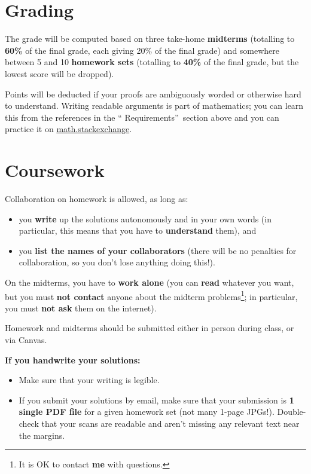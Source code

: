 \documentclass[numbers=enddot,12pt,final,onecolumn,notitlepage]{scrartcl}%
\theoremstyle{definition}
\begin{document}
\bigskip

\section{Grading}

The grade will be computed based on three take-home \textbf{midterms}
(totalling to \textbf{60\%} of the final grade, each giving 20\% of the final
grade) and somewhere between 5 and 10 \textbf{homework sets} (totalling to
\textbf{40\%} of the final grade, but the lowest score will be dropped).

Points will be deducted if your proofs are ambiguously worded or otherwise
hard to understand. Writing readable arguments is part of mathematics; you can
learn this from the references in the \textquotedblleft
Requirements\textquotedblright\ section above and you can practice it on
\href{https://math.stackexchange.com/}{math.stackexchange}.

\section{Coursework}

Collaboration on homework is allowed, as long as:

\begin{itemize}
\item you \textbf{write} up the solutions autonomously and in your own words
(in particular, this means that you have to \textbf{understand} them), and

\item you \textbf{list the names of your collaborators} (there will be no
penalties for collaboration, so you don't lose anything doing this!).
\end{itemize}

On the midterms, you have to \textbf{work alone} (you can \textbf{read}
whatever you want, but you must \textbf{not contact} anyone about the midterm
problems\footnote{It is OK to contact \textbf{me} with questions.}; in
particular, you must \textbf{not ask} them on the internet).

Homework and midterms should be submitted either in person during class, or
via Canvas.

\textbf{If you handwrite your solutions:}

\begin{itemize}
\item Make sure that your writing is legible.

\item If you submit your solutions by email, make sure that your submission is
\textbf{1 single PDF file} for a given homework set (not many 1-page JPGs!).
Double-check that your scans are readable and aren't missing any relevant text
near the margins.
\end{itemize}
\end{document}
